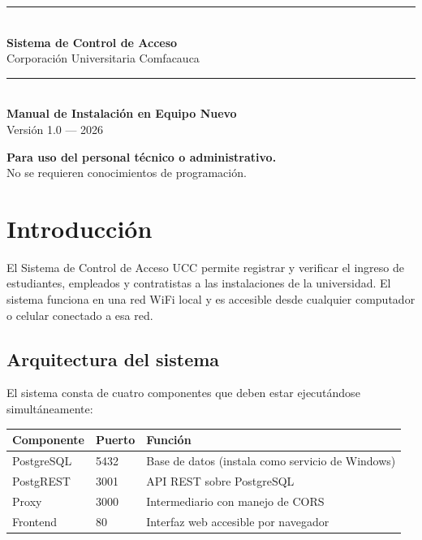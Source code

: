 \documentclass[12pt, a4paper]{article}
\begin{document}
\begin{titlepage}
  \centering
  \vspace*{3cm}
  {\color{uccazul}\rule{\textwidth}{2pt}}\\[1em]
  {\Huge\bfseries\color{uccazul} Sistema de Control de Acceso}\\[0.5em]
  {\LARGE\color{uccgris} Corporación Universitaria Comfacauca}\\[0.5em]
  {\color{uccazul}\rule{\textwidth}{2pt}}\\[2em]

  {\Large\bfseries Manual de Instalación en Equipo Nuevo}\\[0.5em]
  {\large\color{uccgris} Versión 1.0 — 2026}

  \vfill
  {\color{uccgris}
    \textbf{Para uso del personal técnico o administrativo.}\\
    No se requieren conocimientos de programación.
  }
  \vspace{2cm}
\end{titlepage}

\tableofcontents
\newpage

\section{Introducción}

El Sistema de Control de Acceso UCC permite registrar y verificar
el ingreso de estudiantes, empleados y contratistas a las instalaciones
de la universidad. El sistema funciona en una red WiFi local y es
accesible desde cualquier computador o celular conectado a esa red.

\subsection{Arquitectura del sistema}

El sistema consta de cuatro componentes que deben estar ejecutándose
simultáneamente:

\begin{center}
\begin{tabular}{@{}lll@{}}
  \toprule
  \textbf{Componente} & \textbf{Puerto} & \textbf{Función} \\
  \midrule
  PostgreSQL  & 5432 & Base de datos (instala como servicio de Windows) \\
  PostgREST   & 3001 & API REST sobre PostgreSQL \\
  Proxy       & 3000 & Intermediario con manejo de CORS \\
  Frontend    & 80   & Interfaz web accesible por navegador \\
  \bottomrule
\end{tabular}
\end{center}
\end{document}
